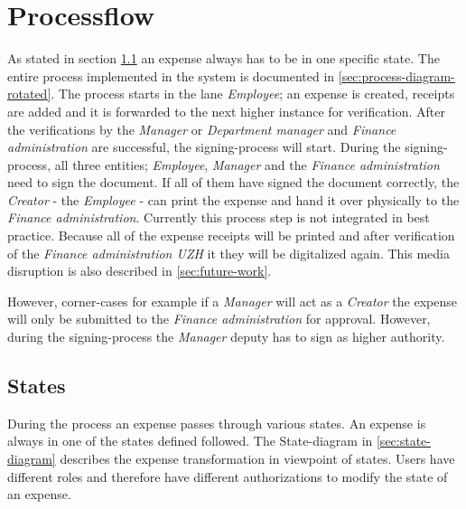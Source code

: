 \section{Processflow}
\label{sec:processflow}
As stated in section \ref{sec:states} an expense always has to be in one specific state. The entire process implemented in the system is documented in \ref{sec:process-diagram-rotated}.\newline
The process starts in the lane \textit{Employee}; an expense is created, receipts are added and it is forwarded to the next higher instance for verification. After the verifications by the \textit{Manager} or \textit{Department manager} and \textit{Finance administration} are successful, the signing-process will start. During the signing-process, all three entities; \textit{Employee}, \textit{Manager} and the \textit{Finance administration} need to sign the document. If all of them have signed the document correctly, the \textit{Creator} - the \textit{Employee} - can print the expense and hand it over physically to the \textit{Finance administration}. Currently this process step is not integrated in best practice. Because all of the expense receipts will be printed and after verification of the \textit{Finance administration UZH} it they will be digitalized again. This media disruption is also described in \ref{sec:future-work}.\par
However, corner-cases for example if a \textit{Manager} will act as a \textit{Creator} the expense will only be submitted to the \textit{Finance administration} for approval. However, during the signing-process the \textit{Manager} deputy has to sign as higher authority.

\subsection{States}
\label{sec:states}
During the process an expense passes through various states. An expense is always in one of the states defined followed. The State-diagram in \ref{sec:state-diagram} describes the expense transformation in viewpoint of states. Users have different roles and therefore have different authorizations to modify the state of an expense.

